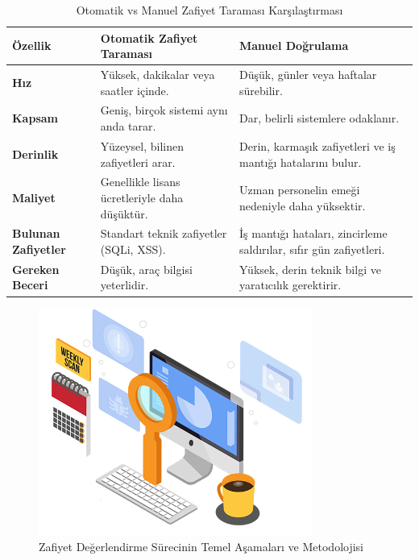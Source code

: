 \begin{table}[h]
\centering
\begin{tabularx}{\textwidth}{|X|X|X|}
\hline
\rowcolor{tableheadcolor}
\textbf{Özellik} & \textbf{Otomatik Zafiyet Taraması} & \textbf{Manuel Doğrulama} \\
\hline
\textbf{Hız} & Yüksek, dakikalar veya saatler içinde. & Düşük, günler veya haftalar sürebilir. \\
\hline
\textbf{Kapsam} & Geniş, birçok sistemi aynı anda tarar. & Dar, belirli sistemlere odaklanır. \\
\hline
\textbf{Derinlik} & Yüzeysel, bilinen zafiyetleri arar. & Derin, karmaşık zafiyetleri ve iş mantığı hatalarını bulur. \\
\hline
\textbf{Maliyet} & Genellikle lisans ücretleriyle daha düşüktür. & Uzman personelin emeği nedeniyle daha yüksektir. \\
\hline
\textbf{Bulunan Zafiyetler} & Standart teknik zafiyetler (SQLi, XSS). & İş mantığı hataları, zincirleme saldırılar, sıfır gün zafiyetleri. \\
\hline
\textbf{Gereken Beceri} & Düşük, araç bilgisi yeterlidir. & Yüksek, derin teknik bilgi ve yaratıcılık gerektirir. \\
\hline
\end{tabularx}
\caption{Otomatik vs Manuel Zafiyet Taraması Karşılaştırması}
\label{tab:auto_vs_manual}
\end{table}

\begin{figure}[H]
    \centering
    \includegraphics[width=0.8\textwidth]{img/vulnerability-assessment.png}
    \caption{Zafiyet Değerlendirme Sürecinin Temel Aşamaları ve Metodolojisi}
    \label{fig:vulnerability-assessment}
\end{figure}

